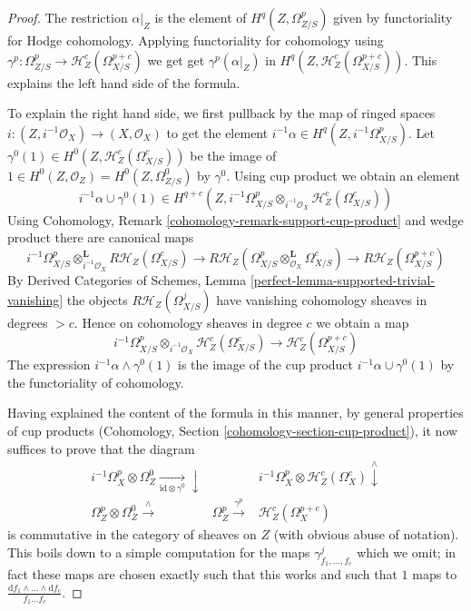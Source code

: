 \begin{proof}
The restriction $\alpha|_Z$ is the element of $H^q(Z, \Omega^p_{Z/S})$
given by functoriality for Hodge cohomology. Applying functoriality
for cohomology using
$\gamma^p : \Omega^p_{Z/S} \to \mathcal{H}^c_Z(\Omega^{p + c}_{X/S})$
we get get $\gamma^p(\alpha|_Z)$ in
$H^q(Z, \mathcal{H}^c_Z(\Omega^{p + c}_{X/S}))$.
This explains the left hand side of the formula.

\medskip\noindent
To explain the right hand side, we first pullback by the map
of ringed spaces $i : (Z, i^{-1}\mathcal{O}_X) \to (X, \mathcal{O}_X)$
to get the element $i^{-1}\alpha \in H^q(Z, i^{-1}\Omega^p_{X/S})$.
Let $\gamma^0(1) \in H^0(Z, \mathcal{H}_Z^c(\Omega^c_{X/S}))$
be the image of $1 \in H^0(Z, \mathcal{O}_Z) = H^0(Z, \Omega^0_{Z/S})$
by $\gamma^0$. Using cup product we obtain an element
$$
i^{-1}\alpha \cup \gamma^0(1)
\in
H^{q + c}(Z,
i^{-1}\Omega^p_{X/S} \otimes_{i^{-1}\mathcal{O}_X}
\mathcal{H}^c_Z(\Omega^c_{X/S}))
$$
Using Cohomology, Remark \ref{cohomology-remark-support-cup-product}
and wedge product there are canonical maps
$$
i^{-1}\Omega^p_{X/S} \otimes_{i^{-1}\mathcal{O}_X}^\mathbf{L}
R\mathcal{H}_Z(\Omega^c_{X/S}) \to
R\mathcal{H}_Z(\Omega^p_{X/S} \otimes_{\mathcal{O}_X}^\mathbf{L}
\Omega^c_{X/S}) \to
R\mathcal{H}_Z(\Omega^{p + c}_{X/S})
$$
By Derived Categories of Schemes, Lemma
\ref{perfect-lemma-supported-trivial-vanishing}
the objects $R\mathcal{H}_Z(\Omega^j_{X/S})$ have vanishing
cohomology sheaves in degrees $> c$. Hence on cohomology
sheaves in degree $c$ we obtain a map
$$
i^{-1}\Omega^p_{X/S} \otimes_{i^{-1}\mathcal{O}_X}
\mathcal{H}^c_Z(\Omega^c_{X/S}) \longrightarrow
\mathcal{H}^c_Z(\Omega^{p + c}_{X/S})
$$
The expression $i^{-1}\alpha \wedge \gamma^0(1)$ is the image
of the cup product $i^{-1}\alpha \cup \gamma^0(1)$ by the
functoriality of cohomology.

\medskip\noindent
Having explained the content of the formula in this manner, by
general properties of cup products
(Cohomology, Section \ref{cohomology-section-cup-product}),
it now suffices to prove that the diagram
$$
\begin{array}{ccc}i^{-1}\Omega^p_X \otimes \Omega^0_Z \underset{\text{id} \otimes \gamma^0}{\longrightarrow}\downarrow &  & i^{-1}\Omega^p_X \otimes \mathcal{H}^c_Z(\Omega^c_X) \overset{\wedge}{\downarrow} \\ \Omega^p_Z \otimes \Omega^0_Z \overset{\wedge}{\longrightarrow} & \Omega^p_Z \overset{\gamma^p}{\longrightarrow} & \mathcal{H}^c_Z(\Omega^{p + c}_X)\end{array}
$$
is commutative in the category of sheaves on $Z$ (with obvious abuse of
notation). This boils down to a simple computation for the maps
$\gamma^j_{f_1, \ldots, f_c}$ which we omit; in fact these maps
are chosen exactly such that this works and such that $1$ maps to
$\frac{\text{d}f_1 \wedge \ldots \wedge \text{d}f_c}{f_1 \ldots f_c}$.
\end{proof}

